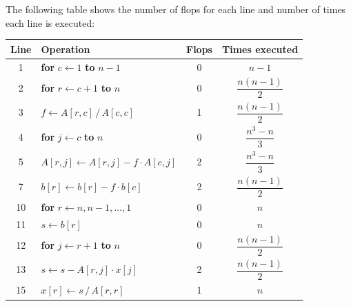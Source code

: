 \documentclass[11pt]{article}
\begin{document}
The following table shows the number of flops for each line and number of times each line is executed:
\begin{center}
  \begin{tabular}{clcc}
    \toprule
    Line & Operation & Flops & Times executed \\
    \midrule
    1 & \textbf{for} $c \leftarrow 1$ \textbf{to} $n-1$ & 0 & $n-1$ \\[0.5em]
    2 & \hspace{1.2em}\textbf{for} $r \leftarrow c+1$ \textbf{to} $n$ & 0 & $\dfrac{n(n-1)}{2}$ \\[1.1em]
    3 & \hspace{2.4em}$f \leftarrow A[r,c] \,/\, A[c,c]$ & 1 & $\dfrac{n(n-1)}{2}$ \\[1.1em]
    4 & \hspace{2.4em}\textbf{for} $j \leftarrow c$ \textbf{to} $n$ & 0 & $\dfrac{n^3-n}{3}$ \\[1.1em]
    5 & \hspace{3.6em}$A[r,j] \leftarrow A[r,j] - f \cdot A[c,j]$ & 2 & $\dfrac{n^3-n}{3}$ \\[1.1em]
    7 & \hspace{2.4em}$b[r] \leftarrow b[r] - f \cdot b[c]$ & 2 & $\dfrac{n(n-1)}{2}$ \\[1.1em]
    10 & \textbf{for} $r \leftarrow n, n-1, \ldots, 1$ & 0 & $n$ \\[0.5em]
    11 & \hspace{1.2em}$s \leftarrow b[r]$ & 0 & $n$ \\[0.5em]
    12 & \hspace{1.2em}\textbf{for} $j \leftarrow r+1$ \textbf{to} $n$ & 0 & $\dfrac{n(n-1)}{2}$ \\[1.1em]
    13 & \hspace{2.4em}$s \leftarrow s - A[r,j] \cdot x[j]$ & 2 & $\dfrac{n(n-1)}{2}$ \\[1.1em]
    15 & \hspace{1.2em}$x[r] \leftarrow s \,/\, A[r,r]$ & 1 & $n$ \\[0.5em]
    \bottomrule
  \end{tabular}
\end{center}
\end{document}
